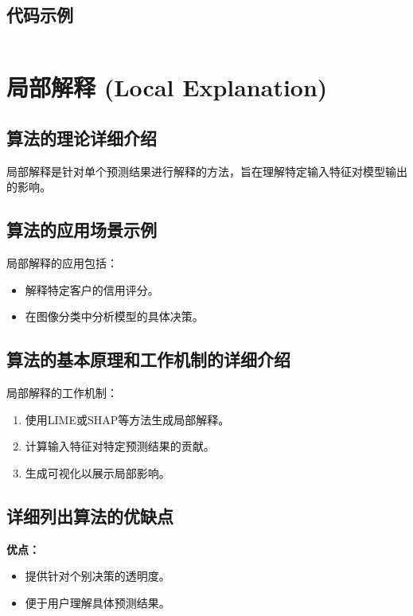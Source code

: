 \subsection*{代码示例}
\begin{lstlisting}

\end{lstlisting}


\section{局部解释 (Local Explanation)}
\subsection*{算法的理论详细介绍}
局部解释是针对单个预测结果进行解释的方法，旨在理解特定输入特征对模型输出的影响。

\subsection*{算法的应用场景示例}
局部解释的应用包括：
\begin{itemize}
    \item 解释特定客户的信用评分。
    \item 在图像分类中分析模型的具体决策。
\end{itemize}

\subsection*{算法的基本原理和工作机制的详细介绍}
局部解释的工作机制：
\begin{enumerate}
    \item 使用LIME或SHAP等方法生成局部解释。
    \item 计算输入特征对特定预测结果的贡献。
    \item 生成可视化以展示局部影响。
\end{enumerate}

\subsection*{详细列出算法的优缺点}
\textbf{优点：}
\begin{itemize}
    \item 提供针对个别决策的透明度。
    \item 便于用户理解具体预测结果。
\end{itemize}

